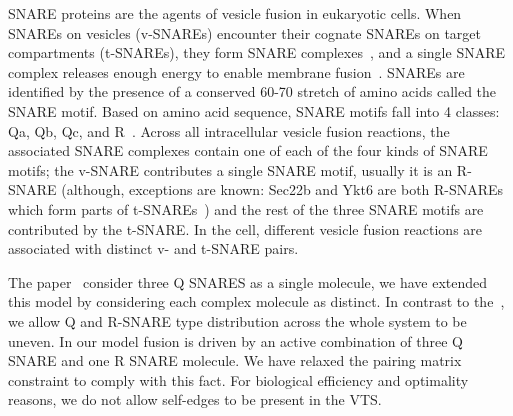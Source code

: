 SNARE proteins are the agents of vesicle fusion in eukaryotic cells. When SNAREs on vesicles (v-SNAREs) encounter their cognate SNAREs on target compartments (t-SNAREs), they form SNARE complexes~\cite{jahn2006snares}, and a single SNARE complex releases enough energy to enable membrane fusion~\cite{van2010one}. SNAREs are identified by the presence of a conserved 60-70 stretch of amino acids called the SNARE motif. Based on amino acid sequence, SNARE motifs fall into 4 classes: Qa, Qb, Qc, and R~\cite{jahn2006snares}. Across all intracellular vesicle fusion reactions, the associated SNARE complexes contain one of each of the four kinds of SNARE motifs; the v-SNARE contributes a single SNARE motif, usually it is an R-SNARE (although, exceptions are known: Sec22b and Ykt6 are both R-SNAREs which form parts of t-SNAREs~\cite{hong2005snares}) and the rest of the three SNARE
motifs are contributed by the t-SNARE. In the cell, different vesicle fusion reactions are associated with distinct v- and t-SNARE pairs.

The paper~\cite{shukla2017discovering} consider three Q SNARES as a single molecule,  we have extended this model by considering each complex molecule as distinct. In contrast to the~\cite{shukla2017discovering}, we allow Q and R-SNARE type distribution across the whole system to be uneven. In our model fusion is driven by an active combination of three Q SNARE and one R SNARE molecule. We have relaxed the pairing matrix constraint to comply with this fact. For biological efficiency and optimality reasons, we do not allow self-edges to be present in the VTS. 


